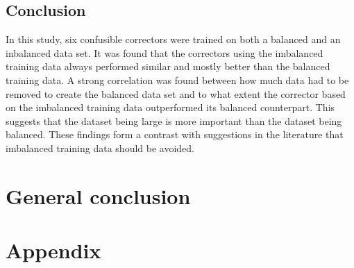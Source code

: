 \documentclass[12pt]{article}
\let\stdsection\section
\renewcommand\section{\newpage\stdsection}
\begin{document}
\subsection{Conclusion}
In this study, six confusible correctors were trained on both a balanced and an inbalanced data set. It was found that the correctors using the imbalanced training data always performed similar and mostly better than the balanced training data. A strong correlation was found between how much data had to be removed to create the balanced data set and to what extent the corrector based on the imbalanced training data outperformed its balanced counterpart. This suggests that the dataset being large is more important than the dataset being balanced. These findings form a contrast with suggestions in the literature that imbalanced training data should be avoided.

\section{General conclusion}

\section{Appendix}
\end{document}
